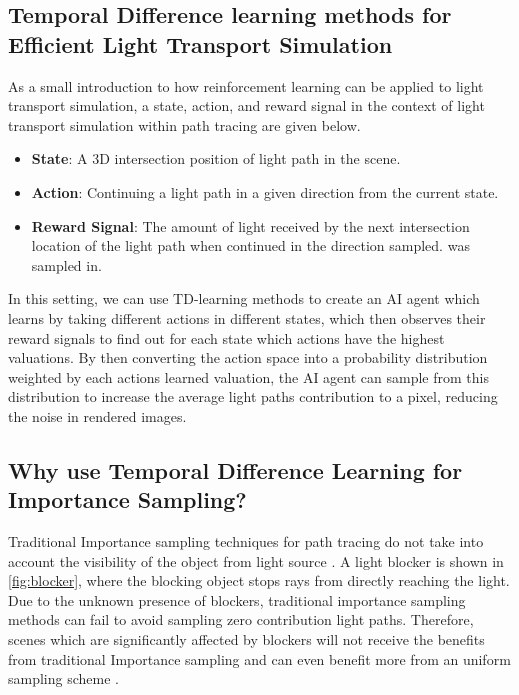 \documentclass[../dissertation.tex]{subfiles}
\begin{document}
\subsection{Temporal Difference learning methods for Efficient Light Transport Simulation}
\label{sec:temp_diff_for_light_transport}

 As a small introduction to how reinforcement learning can be applied to light transport simulation, a state, action, and reward signal in the context of light transport simulation within path tracing are given below.

\begin{itemize}

\item \textbf{State}: A 3D intersection position of light path in the scene.

\item \textbf{Action}: Continuing a light path in a given direction from the current 
state.

\item \textbf{Reward Signal}: The amount of light received by the next intersection location
of the light path when continued in the direction sampled.
was sampled in.

\end{itemize}

In this setting, we can use TD-learning methods to create an AI agent which learns by taking different actions in different states, which then observes their reward signals to find out for each state which actions have the highest valuations. By then converting the action space into a probability distribution weighted by each actions learned valuation, the AI agent can sample from this distribution to increase the average light paths contribution to a pixel, reducing the noise in rendered images. 

\subsection{Why use Temporal Difference Learning for Importance Sampling?}
\label{sec:why_temp_diff}

Traditional Importance sampling techniques for path tracing do not take into account the visibility of the object from light source \cite{dahm2017learning}. A light blocker is shown in \ref{fig:blocker}, where the  blocking object stops rays from directly reaching the light. Due to the unknown presence of blockers, traditional importance sampling methods can fail to avoid sampling zero contribution light paths. Therefore, scenes which are significantly affected by blockers will not receive the benefits from traditional Importance sampling and can even benefit more from an uniform sampling scheme \cite{ramamoorthi2012theory}.
\end{document}
